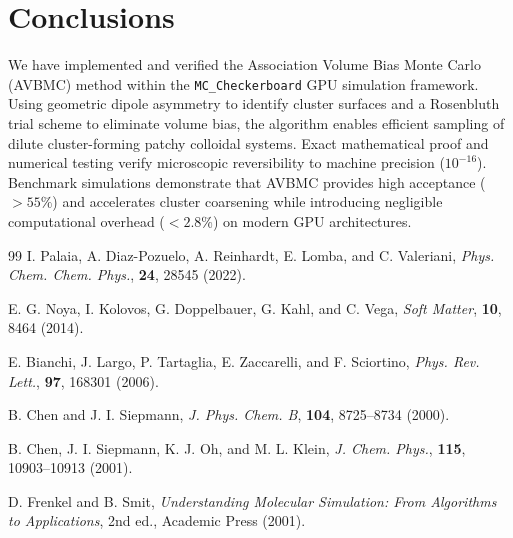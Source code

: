 \documentclass[11pt,a4paper]{article}
\begin{document}
\section{Conclusions}
We have implemented and verified the Association Volume Bias Monte Carlo (AVBMC) method within the \texttt{MC\_Checkerboard} GPU simulation framework. Using geometric dipole asymmetry to identify cluster surfaces and a Rosenbluth trial scheme to eliminate volume bias, the algorithm enables efficient sampling of dilute cluster-forming patchy colloidal systems. Exact mathematical proof and numerical testing verify microscopic reversibility to machine precision ($10^{-16}$). Benchmark simulations demonstrate that AVBMC provides high acceptance ($>55\%$) and accelerates cluster coarsening while introducing negligible computational overhead ($< 2.8\%$) on modern GPU architectures.

\begin{thebibliography}{99}
I. Palaia, A. Diaz-Pozuelo, A. Reinhardt, E. Lomba, and C. Valeriani,
\textit{Phys. Chem. Chem. Phys.}, \textbf{24}, 28545 (2022).

E. G. Noya, I. Kolovos, G. Doppelbauer, G. Kahl, and C. Vega,
\textit{Soft Matter}, \textbf{10}, 8464 (2014).

E. Bianchi, J. Largo, P. Tartaglia, E. Zaccarelli, and F. Sciortino,
\textit{Phys. Rev. Lett.}, \textbf{97}, 168301 (2006).

B. Chen and J. I. Siepmann,
\textit{J. Phys. Chem. B}, \textbf{104}, 8725--8734 (2000).

B. Chen, J. I. Siepmann, K. J. Oh, and M. L. Klein,
\textit{J. Chem. Phys.}, \textbf{115}, 10903--10913 (2001).

D. Frenkel and B. Smit,
\textit{Understanding Molecular Simulation: From Algorithms to Applications}, 2nd ed., Academic Press (2001).
\end{thebibliography}
\end{document}

